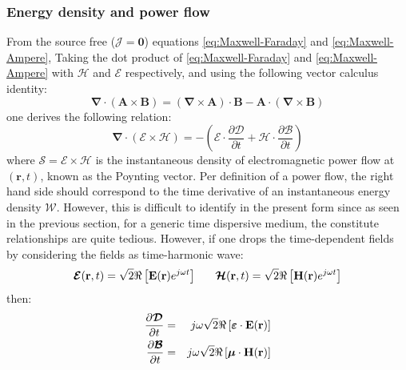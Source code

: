 \subsubsection{Energy density and power flow}
\parencite[p.78]{Felsen1994}

From the source free ($\boldsymbol{\mathcal{J}}=\boldsymbol{0}$) equations \ref{eq:Maxwell-Faraday} and \ref{eq:Maxwell-Ampere}, Taking the dot product of \ref{eq:Maxwell-Faraday} and \ref{eq:Maxwell-Ampere} with $\boldsymbol{\mathcal{H}}$  and $\boldsymbol{\mathcal{E}}$ respectively, and using the following vector calculus identity:
$$
\boldsymbol{\nabla}\cdot (\mathbf{A} \times \mathbf{B})
=
(\boldsymbol{\nabla} \times \mathbf{A})\cdot\mathbf{B} - \mathbf{A}\cdot (\boldsymbol{\nabla}\times \mathbf{B})
$$
one derives the following relation:
\begin{equation}
\boldsymbol{\nabla}\cdot(\boldsymbol{\mathcal{E}}\times\boldsymbol{\mathcal{H}})
=
- \left(
\boldsymbol{\mathcal{E}}\cdot\frac{\partial \boldsymbol{\mathcal{D}}}{\partial t}
+
\boldsymbol{\mathcal{H}}\cdot\frac{\partial \boldsymbol{\mathcal{B}}}{\partial t}
\right)
\label{eq:poynting_theorem_without_source}
\end{equation}
where $\boldsymbol{\mathcal{S}}=\boldsymbol{\mathcal{E}}\times\boldsymbol{\mathcal{H}}$ is the instantaneous density of electromagnetic power flow at $(\mathbf{r},t)$, known as the Poynting vector. Per definition of a power flow, the right hand side should correspond to the time derivative of an instantaneous energy density $\mathcal{W}$. However, this is difficult to identify in the present form since as seen in the previous section, for a generic time dispersive medium, the constitute relationships are quite tedious. However, if one drops the time-dependent fields by considering the fields as time-harmonic wave:
$$
\boldsymbol{\mathcal{E}}(\mathbf{r},t) = \sqrt{2} \Re\left[\mathbf{E}(\mathbf{r}) e^{j\omega t}\right]
\;\;\;\;\;\;
\boldsymbol{\mathcal{H}}(\mathbf{r},t) = \sqrt{2} \Re\left[\mathbf{H}(\mathbf{r}) e^{j\omega t}\right]
$$
then:
\begin{eqnarray}
\frac{\partial \boldsymbol{\mathcal{D}}}{\partial t} 
&=& 
j\omega \sqrt{2} \Re\left[\boldsymbol{\varepsilon} \cdot \mathbf{E}(\mathbf{r})\right]
\\
\frac{\partial \boldsymbol{\mathcal{B}}}{\partial t} 
&=& 
j\omega \sqrt{2} \Re\left[\boldsymbol{\mu} \cdot \mathbf{H}(\mathbf{r})\right]
\end{eqnarray}

